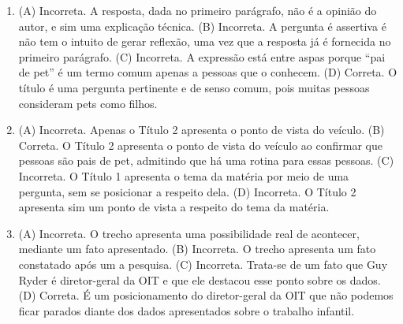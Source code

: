 \begin{enumerate}
\item (A) Incorreta. A resposta, dada no primeiro parágrafo, não é a opinião do
autor, e sim uma explicação técnica.
(B) Incorreta. A pergunta é assertiva é não tem o intuito de gerar
reflexão, uma vez que a resposta já é fornecida no primeiro parágrafo.
(C) Incorreta. A expressão está entre aspas porque ``pai de pet'' é um
termo comum apenas a pessoas que o conhecem.
(D) Correta. O título é uma pergunta pertinente e de senso comum, pois
muitas pessoas consideram pets como filhos.

\item (A) Incorreta. Apenas o Título 2 apresenta o ponto de vista do veículo.
(B) Correta. O Título 2 apresenta o ponto de vista do veículo ao
confirmar que pessoas são pais de pet, admitindo que há uma rotina para
essas pessoas.
(C) Incorreta. O Título 1 apresenta o tema da matéria por meio de uma
pergunta, sem se posicionar a respeito dela.
(D) Incorreta. O Título 2 apresenta sim um ponto de vista a respeito do
tema da matéria.

\item (A) Incorreta. O trecho apresenta uma possibilidade real de acontecer,
mediante um fato apresentado.
(B) Incorreta. O trecho apresenta um fato constatado após um a pesquisa.
(C) Incorreta. Trata-se de um fato que Guy Ryder é diretor-geral da OIT e
que ele destacou esse ponto sobre os dados.
(D) Correta. É um posicionamento do diretor-geral da OIT que não podemos
ficar parados diante dos dados apresentados sobre o trabalho infantil.
\end{enumerate}


